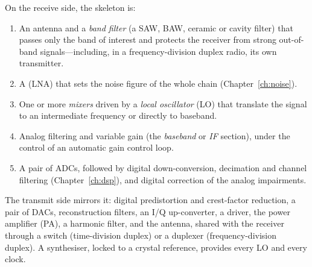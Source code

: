 On the receive side, the skeleton is:
\begin{enumerate}
\item An antenna and a \emph{band filter} (a SAW, BAW, ceramic or cavity filter) that passes only the
band of interest and protects the receiver from strong out-of-band signals---including, in a
frequency-division duplex radio, its own transmitter.
\item A  (LNA) that sets the noise figure of the whole chain
(Chapter~\ref{ch:noise}).
\item One or more \emph{mixers} driven by a \emph{local oscillator} (LO) that translate the signal to
an intermediate frequency or directly to baseband.
\item Analog filtering and variable gain (the \emph{baseband} or \emph{IF} section), under the control
of an automatic gain control loop.
\item A pair of ADCs, followed by digital down-conversion, decimation and channel filtering
(Chapter~\ref{ch:dsp}), and digital correction of the analog impairments.
\end{enumerate}
The transmit side mirrors it: digital predistortion and crest-factor reduction, a pair of DACs,
reconstruction filters, an I/Q up-converter, a driver, the power amplifier (PA), a harmonic filter,
and the antenna, shared with the receiver through a switch (time-division duplex) or a duplexer
(frequency-division duplex). A synthesiser, locked to a crystal reference, provides every LO and
every clock.

